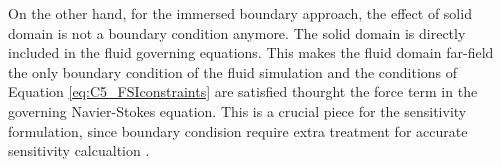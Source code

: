On the other hand, for the immersed boundary approach, the effect of solid domain is not a boundary condition anymore. The solid domain is directly included in the fluid governing equations. This makes the fluid domain far-field the only boundary condition of the fluid simulation and the conditions of Equation \eqref{eq:C5_FSIconstraints} are satisfied thourght the force term in the governing Navier-Stokes equation. This is a crucial piece for the sensitivity formulation, since boundary condision require extra treatment for accurate sensitivity calcualtion \cite{cross2015local}.